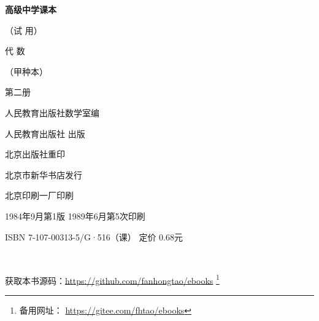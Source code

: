 \begin{titlepage}
    \begin{center}
        \vspace*{3cm}

        {\Large \textbf{高级中学课本} }

        {\Large（试 用）}

        \vspace{1cm}

        {\Huge 代 \qquad 数}

        \vspace{0.5cm}

        {\Large （甲种本）}

        {\Large 第二册}

        \vspace{1cm}
        {\Large 人民教育出版社数学室编}

        \vfill


        人民教育出版社 出版

        北京出版社重印

        北京市新华书店发行

        北京印刷一厂印刷

        1984年9月第1版  \qquad 1989年6月第5次印刷

        ISBN 7-107-00313-5/G·516（课） \quad 定价 0.68元

        \,

        获取本书源码：\url{https://github.com/fanhongtao/ebooks} \footnote{备用网址： \url{https://gitee.com/fhtao/ebooks} }
    \end{center}
 \end{titlepage}

